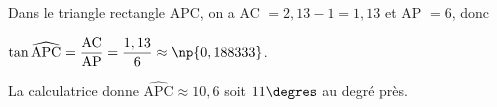 
\medskip


%
%
%
%
%
%
%
Dans le triangle rectangle APC, on a AC $ = 2,13 - 1 = 1,13$ et AP $ = 6$, donc 

$\tan \widehat{\text{APC}} = \dfrac{\text{AC}}{\text{AP}} = \dfrac{1,13}{6} \approx \np{0,188333}$.

La calculatrice donne $\widehat{\text{APC}} \approx 10,6$ soit $11\degres$ au degré près.
\vspace{0,5cm}

